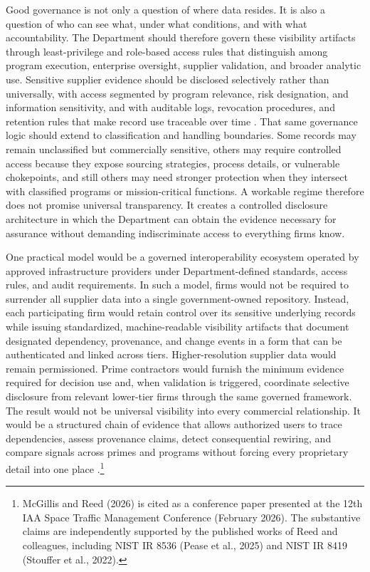Good governance is not only a question of where data resides. It is also a question of who can see what, under what conditions, and with what accountability. The Department should therefore govern these visibility artifacts through least-privilege and role-based access rules that distinguish among program execution, enterprise oversight, supplier validation, and broader analytic use. Sensitive supplier evidence should be disclosed selectively rather than universally, with access segmented by program relevance, risk designation, and information sensitivity, and with auditable logs, revocation procedures, and retention rules that make record use traceable over time \parencite{ch5_nist800161r1upd1,ch5_dscsa_interop_2023,ch5_nist_ir_8536_2,ch5_nist_ir_8419,ch5_farsubpart423}. That same governance logic should extend to classification and handling boundaries. Some records may remain unclassified but commercially sensitive, others may require controlled access because they expose sourcing strategies, process details, or vulnerable chokepoints, and still others may need stronger protection when they intersect with classified programs or mission-critical functions. A workable regime therefore does not promise universal transparency. It creates a controlled disclosure architecture in which the Department can obtain the evidence necessary for assurance without demanding indiscriminate access to everything firms know.

One practical model would be a governed interoperability ecosystem operated by approved infrastructure providers under Department-defined standards, access rules, and audit requirements. In such a model, firms would not be required to surrender all supplier data into a single government-owned repository. Instead, each participating firm would retain control over its sensitive underlying records while issuing standardized, machine-readable visibility artifacts that document designated dependency, provenance, and change events in a form that can be authenticated and linked across tiers. Higher-resolution supplier data would remain permissioned. Prime contractors would furnish the minimum evidence required for decision use and, when validation is triggered, coordinate selective disclosure from relevant lower-tier firms through the same governed framework. The result would not be universal visibility into every commercial relationship. It would be a structured chain of evidence that allows authorized users to trace dependencies, assess provenance claims, detect consequential rewiring, and compare signals across primes and programs without forcing every proprietary detail into one place \parencite{ch5_dscsa_interop_2023,ch5_ntia_sbom_2021,ch5_nist_ir_8536_2,ch5_space_trustworthy_data_2025}.\footnote{McGillis and Reed (2026) is cited as a conference paper presented at the 12th IAA Space Traffic Management Conference (February 2026). The substantive claims are independently supported by the published works of Reed and colleagues, including NIST IR 8536 (Pease et al., 2025) and NIST IR 8419 (Stouffer et al., 2022).}

